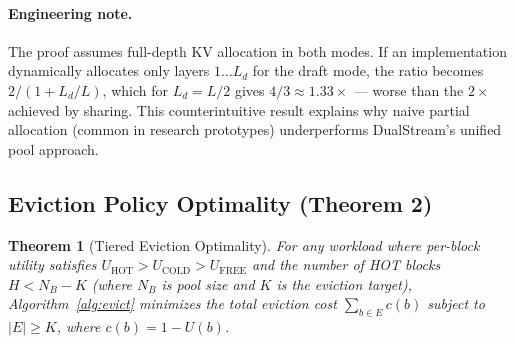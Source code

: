 \documentclass[review]{elsarticle}
\newtheorem{theorem}{Theorem}[section]
\theoremstyle{definition}
\theoremstyle{remark}
\begin{document}
\paragraph{Engineering note.}
The proof assumes full-depth KV allocation in both modes. If an
implementation dynamically allocates only layers $1 \ldots L_d$ for
the draft mode, the ratio becomes $2/(1 + L_d/L)$, which for
$L_d = L/2$ gives $4/3 \approx 1.33\times$ --- worse than the $2\times$
achieved by sharing. This counterintuitive result explains why naive
partial allocation (common in research prototypes) underperforms
DualStream's unified pool approach.

\subsection{Eviction Policy Optimality (Theorem 2)}

\begin{theorem}[Tiered Eviction Optimality]
\label{thm:eviction}
For any workload where per-block utility satisfies
$U_{\text{HOT}} > U_{\text{COLD}} > U_{\text{FREE}}$ and the number
of HOT blocks $H < N_B - K$ (where $N_B$ is pool size and $K$ is the
eviction target), Algorithm~\ref{alg:evict} minimizes the total eviction
cost $\sum_{b \in E} c(b)$ subject to $|E| \ge K$, where
$c(b) = 1 - U(b)$.
\end{theorem}
\end{document}
